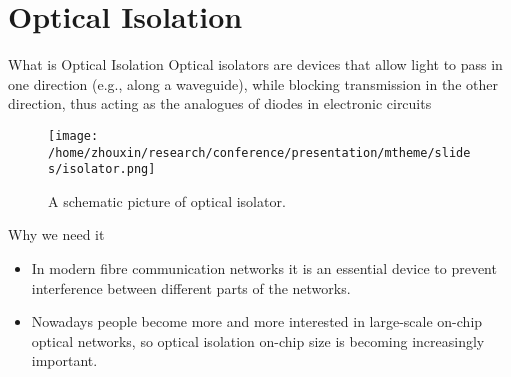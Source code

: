 \documentclass{beamer}
\begin{document}
\section{Optical Isolation}
\begin{frame}{What is Optical Isolation}
Optical isolators are devices that allow light to pass in one direction (e.g., along a waveguide), while blocking transmission in the other direction, thus acting as the analogues of diodes in electronic circuits
\begin{figure}

  \centering
    \texttt{[image: /home/zhouxin/research/conference/presentation/mtheme/slides/isolator.png]}
      \caption{A schematic picture of optical isolator.}
\end{figure}
     \vskip -0.5cm
    \begin{block}
    {Why we need it}
      \begin{itemize}
        \item In modern fibre communication networks it is an essential device to prevent interference between different parts of the networks.
        \item Nowadays people become more and more interested in large-scale on-chip optical networks, so optical isolation on-chip size is becoming increasingly important.
    \end{itemize}
  \end{block}
\end{frame}

 
\end{document}
